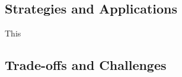 \subsection{Strategies and Applications}
\label{subsec:subsection1}
This

\subsection{Trade-offs and Challenges}
\label{subsec:subsection2}

%
%

